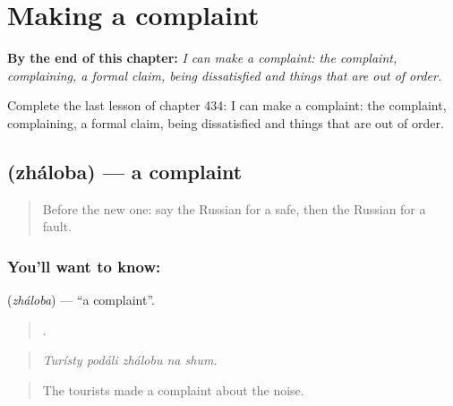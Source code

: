 
\chapter{Making a complaint}
\label{ch:ru-making-a-complaint}

\begin{chapteropening}
\textbf{By the end of this chapter:} \emph{I can make a complaint: the complaint, complaining, a formal claim, being dissatisfied and things that are out of order.}

Complete the last lesson of chapter 434: I can make a complaint: the complaint, complaining, a formal claim, being dissatisfied and things that are out of order.
\end{chapteropening}

\section[\texorpdfstring{\ru{жалоба} (zháloba)}{жалоба (zháloba)}]{ (zháloba) — a complaint}

\label{lesson:RU-C434-zhaloba}



\begin{quote}
Before the new one: say the Russian for a safe, then the Russian for a fault.
\end{quote}

\subsection*{You'll want to know: }
\textbf{} (\emph{zháloba}) — \textquotedblleft{}a complaint\textquotedblright{}.

\begin{quote}
    .
\end{quote}

\begin{quote}
\emph{Turísty podáli zhálobu na shum.}
\end{quote}

\begin{quote}
The tourists made a complaint about the noise.
\end{quote}


